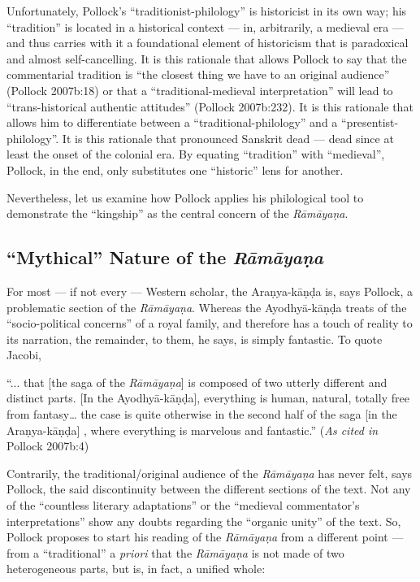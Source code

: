 Unfortunately, Pollock’s “traditionist-philology” is historicist in its own way; his “tradition” is located in a historical context --- in, arbitrarily, a medieval era --- and thus carries with it a foundational element of historicism that is paradoxical and almost self-cancelling. It is this rationale that allows Pollock to say that the commentarial tradition is “the closest thing we have to an original audience” (Pollock 2007b:18) or that a “traditional-medieval interpretation” will lead to “trans-historical authentic attitudes” (Pollock 2007b:232). It is this rationale that allows him to differentiate between a “traditional-philology” and a “presentist-philology”. It is this rationale that pronounced Sanskrit dead --- dead since at least the onset of the colonial era. By equating “tradition” with “medieval”, Pollock, in the end, only substitutes one “historic” lens for another. 

Nevertheless, let us examine how Pollock applies his philological tool to demonstrate the “kingship” as the central concern of the {\sl Rāmāyaṇa}. 

\subsection{“Mythical” Nature of the {\sl\bfseries Rāmāyaṇa}}\label{sec2.2}

For most --- if not every --- Western scholar, the Araṇya-kāṇḍa is, says Pollock, a problematic section of the {\sl Rāmāyaṇa}. Whereas the Ayodhyā-kāṇḍa treats of the “socio-political concerns” of a royal family, and therefore has a touch of reality to its narration, the remainder, to them, he says, is simply fantastic. To quote Jacobi,

\begin{myquote}
“... that [the saga of the {\sl Rāmāyaṇa}] is composed of two utterly different and distinct parts. [In the Ayodhyā-kāṇḍa], everything is human, natural, totally free from fantasy… the case is quite otherwise in the second half of the saga [in the Araṇya-kāṇḍa] , where everything is marvelous and fantastic.” 	
\hfill ({\sl As cited in} Pollock 2007b:4)
\end{myquote}

Contrarily, the traditional/original audience of the {\sl Rāmāyaṇa} has never felt, says Pollock, the said discontinuity between the different sections of the text. Not any of the “countless literary adaptations” or the “medieval commentator’s interpretations” show any doubts regarding the “organic unity” of the text. So, Pollock proposes to start his reading of the {\sl Rāmāyaṇa} from a different point --- from a “traditional” a {\sl priori} that the {\sl Rāmāyaṇa} is not made of two heterogeneous parts, but is, in fact, a unified whole:

